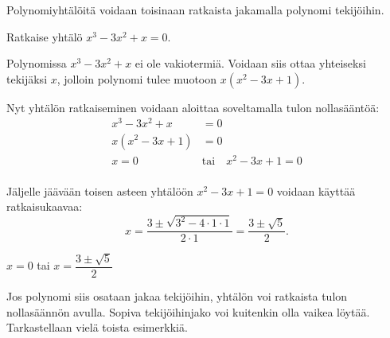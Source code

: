 Polynomiyhtälöitä voidaan toisinaan ratkaista jakamalla polynomi tekijöihin.


\begin{esimerkki}
Ratkaise yhtälö $x^3 - 3x^2 + x = 0$.

\begin{esimratk}
Polynomissa $x^3 - 3x^2 + x$ ei ole vakiotermiä. Voidaan siis ottaa yhteiseksi tekijäksi $x$, jolloin polynomi tulee muotoon $x(x^2 - 3x + 1)$. 

Nyt yhtälön ratkaiseminen voidaan aloittaa soveltamalla tulon nollasääntöä:
\begin{align*}
x^3 - 3x^2 + x & =0 \\
x(x^2 - 3x + 1) & =0 \\
x=0 \quad & \text{tai} \quad x^2 - 3x + 1 = 0 \\
\end{align*}

Jäljelle jäävään toisen asteen yhtälöön $x^2 - 3x + 1 = 0$ voidaan käyttää ratkaisukaavaa:
\[
x =\frac{3\pm\sqrt{3^2-4\cdot 1\cdot 1}}{2\cdot 1}=\frac{3\pm \sqrt{5}}{2}.
\]
\end{esimratk}

\begin{esimvast} $x=0$ tai $x=\dfrac{3\pm \sqrt{5}}{2}$
\end{esimvast}
\end{esimerkki}

Jos polynomi siis osataan jakaa tekijöihin, yhtälön voi ratkaista tulon nollasäännön avulla.
Sopiva tekijöihinjako voi kuitenkin olla vaikea löytää. Tarkastellaan vielä toista esimerkkiä.

